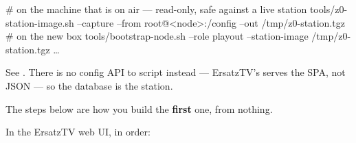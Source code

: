 \documentclass[fontpath=fonts/,logopath=logo/]{riposte-doc}
\begin{document}
\ripcodeopen
{}
\begin{ripcodeblock}
# on the machine that is on air — read-only, safe against a live station
tools/z0-station-image.sh --capture --from root@<node>:/config --out /tmp/z0-station.tgz
# on the new box
tools/bootstrap-node.sh --role playout --station-image /tmp/z0-station.tgz …
\end{ripcodeblock}
\ripcodesizereset\ripcodeclose

See . There is no config API to script instead — ErsatzTV's  serves the SPA, not JSON — so the database is the station.

The steps below are how you build the \textbf{first} one, from nothing.

In the ErsatzTV web UI, in order:
\end{document}

